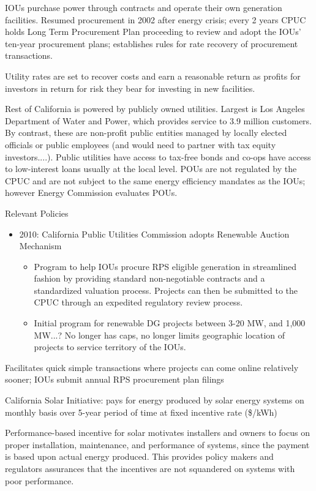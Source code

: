 \documentclass[11pt, oneside]{article}   	%
\begin{document}
IOUs purchase power through contracts and operate their own generation facilities.  Resumed procurement in 2002 after energy crisis; every 2 years CPUC holds Long Term Procurement Plan proceeding to review and adopt the IOUs' ten-year procurement plans; establishes rules for rate recovery of procurement transactions.  

Utility rates are set to recover costs and earn a reasonable return as profits for investors in return for risk they bear for investing in new facilities.  

Rest of California is powered by publicly owned utilities.  Largest is Los Angeles Department of Water and Power, which provides service to 3.9 million customers.  By contrast, these are non-profit public entities managed by locally elected officials or public employees (and would need to partner with tax equity investors....).  Public utilities have access to tax-free bonds and co-ops have access to low-interest loans usually at the local level. POUs are not regulated by the CPUC and are not subject to the same energy efficiency mandates as the IOUs; however Energy Commission evaluates POUs.    


Relevant Policies
\begin{itemize}
\item 2010: California Public Utilities Commission adopts Renewable Auction Mechanism
\begin{itemize}
\item Program to help IOUs procure RPS eligible generation in streamlined fashion by providing standard non-negotiable contracts and a standardized valuation process.  Projects can then be submitted to the CPUC through an expedited regulatory review process.
\item Initial program for renewable DG projects between 3-20 MW, and 1,000 MW...?  No longer has caps, no longer limits geographic location of projects to service territory of the IOUs. 
\end{itemize}
\end{itemize}



Facilitates quick simple transactions where projects can come online relatively sooner; IOUs submit annual RPS procurement plan filings  

California Solar Initiative:  pays for energy produced by solar energy systems on monthly basis over 5-year period of time at fixed incentive rate (\$/kWh) 

Performance-based incentive for solar motivates installers and owners to focus on proper installation, maintenance, and performance of systems, since the payment is based upon actual energy produced.  This provides policy makers and regulators assurances that the incentives are not squandered on systems with poor performance. 
\end{document}

